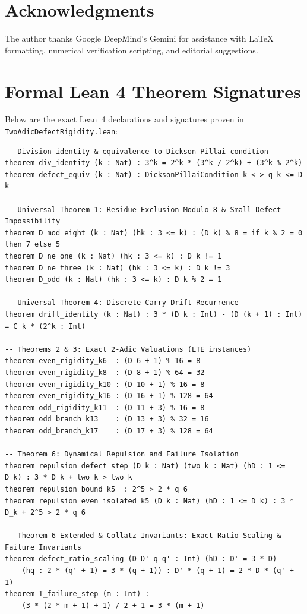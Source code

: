 \documentclass[11pt,reqno]{amsart}
\theoremstyle{definition}
\numberwithin{equation}{section}
\begin{document}
\section*{Acknowledgments}
The author thanks Google DeepMind's Gemini for assistance with \LaTeX{} formatting, numerical verification scripting, and editorial suggestions.

\appendix
\section{Formal Lean 4 Theorem Signatures}
Below are the exact Lean~4 declarations and signatures proven in \texttt{TwoAdicDefectRigidity.lean}:

\begin{tiny}
\begin{verbatim}
-- Division identity & equivalence to Dickson-Pillai condition
theorem div_identity (k : Nat) : 3^k = 2^k * (3^k / 2^k) + (3^k % 2^k)
theorem defect_equiv (k : Nat) : DicksonPillaiCondition k <-> q k <= D k

-- Universal Theorem 1: Residue Exclusion Modulo 8 & Small Defect Impossibility
theorem D_mod_eight (k : Nat) (hk : 3 <= k) : (D k) % 8 = if k % 2 = 0 then 7 else 5
theorem D_ne_one (k : Nat) (hk : 3 <= k) : D k != 1
theorem D_ne_three (k : Nat) (hk : 3 <= k) : D k != 3
theorem D_odd (k : Nat) (hk : 3 <= k) : D k % 2 = 1

-- Universal Theorem 4: Discrete Carry Drift Recurrence
theorem drift_identity (k : Nat) : 3 * (D k : Int) - (D (k + 1) : Int) = C k * (2^k : Int)

-- Theorems 2 & 3: Exact 2-Adic Valuations (LTE instances)
theorem even_rigidity_k6  : (D 6 + 1) % 16 = 8
theorem even_rigidity_k8  : (D 8 + 1) % 64 = 32
theorem even_rigidity_k10 : (D 10 + 1) % 16 = 8
theorem even_rigidity_k16 : (D 16 + 1) % 128 = 64
theorem odd_rigidity_k11  : (D 11 + 3) % 16 = 8
theorem odd_branch_k13    : (D 13 + 3) % 32 = 16
theorem odd_branch_k17    : (D 17 + 3) % 128 = 64

-- Theorem 6: Dynamical Repulsion and Failure Isolation
theorem repulsion_defect_step (D_k : Nat) (two_k : Nat) (hD : 1 <= D_k) : 3 * D_k + two_k > two_k
theorem repulsion_bound_k5  : 2^5 > 2 * q 6
theorem repulsion_even_isolated_k5 (D_k : Nat) (hD : 1 <= D_k) : 3 * D_k + 2^5 > 2 * q 6

-- Theorem 6 Extended & Collatz Invariants: Exact Ratio Scaling & Failure Invariants
theorem defect_ratio_scaling (D D' q q' : Int) (hD : D' = 3 * D)
    (hq : 2 * (q' + 1) = 3 * (q + 1)) : D' * (q + 1) = 2 * D * (q' + 1)
theorem T_failure_step (m : Int) :
    (3 * (2 * m + 1) + 1) / 2 + 1 = 3 * (m + 1)


\end{verbatim}
\end{tiny}
\end{document}
